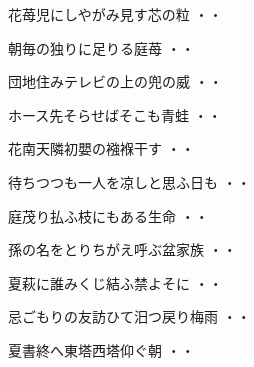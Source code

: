 \begin{shiika}花苺児にしやがみ見す芯の粒
\hfill{・・}\end{shiika}
\vspace{0.6cm}
\begin{shiika}朝毎の独りに足りる庭苺
\hfill{・・}\end{shiika}
\vspace{0.6cm}
\begin{shiika}団地住みテレビの上の兜の威
\hfill{・・}\end{shiika}
\vspace{0.6cm}
\begin{shiika}ホース先そらせばそこも青蛙
\hfill{・・}\end{shiika}
\vspace{0.6cm}
\begin{shiika}花南天隣初嬰の襁褓干す
\hfill{・・}\end{shiika}
\vspace{0.6cm}
\begin{shiika}待ちつつも一人を凉しと思ふ日も
\hfill{・・}\end{shiika}
\vspace{0.6cm}
\begin{shiika}庭茂り払ふ枝にもある生命
\hfill{・・}\end{shiika}
\vspace{0.6cm}
\begin{shiika}孫の名をとりちがえ呼ぶ盆家族
\hfill{・・}\end{shiika}
\vspace{0.6cm}
\begin{shiika}夏萩に誰みくじ結ふ禁よそに
\hfill{・・}\end{shiika}
\vspace{0.6cm}
\begin{shiika}忌ごもりの友訪ひて汨つ戻り梅雨
\hfill{・・}\end{shiika}
\vspace{0.6cm}
\begin{shiika}夏書終へ東塔西塔仰ぐ朝
\hfill{・・}\end{shiika}
\vspace{0.6cm}
